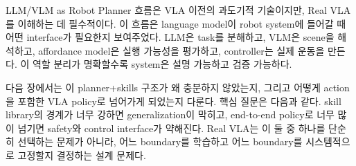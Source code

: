 LLM/VLM as Robot Planner 흐름은 VLA 이전의 과도기적 기술이지만, Real VLA를 이해하는 데 필수적이다. 이 흐름은 language model이 robot system에 들어갈 때 어떤 interface가 필요한지 보여주었다. LLM은 task를 분해하고, VLM은 scene을 해석하고, affordance model은 실행 가능성을 평가하고, controller는 실제 운동을 만든다. 이 역할 분리가 명확할수록 system은 설명 가능하고 검증 가능하다.

다음 장에서는 이 planner+skills 구조가 왜 충분하지 않았는지, 그리고 어떻게 action을 포함한 VLA policy로 넘어가게 되었는지 다룬다. 핵심 질문은 다음과 같다. skill library의 경계가 너무 강하면 generalization이 막히고, end-to-end policy로 너무 많이 넘기면 safety와 control interface가 약해진다. Real VLA는 이 둘 중 하나를 단순히 선택하는 문제가 아니라, 어느 boundary를 학습하고 어느 boundary를 시스템적으로 고정할지 결정하는 설계 문제다.
